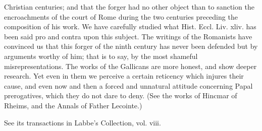 Christian centuries; and that the forger had no other object than to sanction the encroachments of the court of Rome during the two centuries preceding the composition of his work. We have carefully studied what Hist. Eccl. Liv. xliv. has been said pro and contra upon this subject. The writings of the Romanists have convinced us that this forger of the ninth century has never been defended but by arguments worthy of him; that is to say, by the most shameful misrepresentations. The works of the Gallicans are more honest, and show deeper research. Yet even in them we perceive a certain reticency which injures their cause, and even now and then a forced and unnatural attitude concerning Papal prerogatives, which they do not dare to deny. (See the works of Hincmar of Rheims, and the Annals of Father Lecointe.)

See its transactions in Labbe’s Collection, vol. viii.

